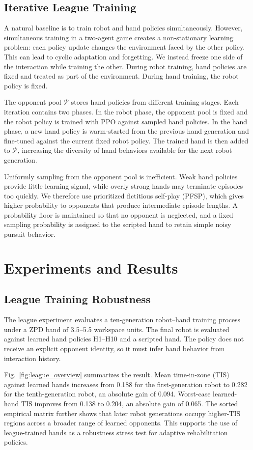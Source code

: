 \documentclass[lettersize,journal]{IEEEtran}
\begin{document}
\subsection{Iterative League Training}
A natural baseline is to train robot and hand policies simultaneously. However, simultaneous training in a two-agent game creates a non-stationary learning problem: each policy update changes the environment faced by the other policy. This can lead to cyclic adaptation and forgetting. We instead freeze one side of the interaction while training the other. During robot training, hand policies are fixed and treated as part of the environment. During hand training, the robot policy is fixed.

The opponent pool $\mathcal{P}$ stores hand policies from different training stages. Each iteration contains two phases. In the robot phase, the opponent pool is fixed and the robot policy is trained with PPO against sampled hand policies. In the hand phase, a new hand policy is warm-started from the previous hand generation and fine-tuned against the current fixed robot policy. The trained hand is then added to $\mathcal{P}$, increasing the diversity of hand behaviors available for the next robot generation.

Uniformly sampling from the opponent pool is inefficient. Weak hand policies provide little learning signal, while overly strong hands may terminate episodes too quickly. We therefore use prioritized fictitious self-play (PFSP), which gives higher probability to opponents that produce intermediate episode lengths. A probability floor is maintained so that no opponent is neglected, and a fixed sampling probability is assigned to the scripted hand to retain simple noisy pursuit behavior.

\section{Experiments and Results}
\subsection{League Training Robustness}
The league experiment evaluates a ten-generation robot--hand training process under a ZPD band of 3.5--5.5 workspace units. The final robot is evaluated against learned hand policies H1--H10 and a scripted hand. The policy does not receive an explicit opponent identity, so it must infer hand behavior from interaction history.

Fig.~\ref{fig:league_overview} summarizes the result. Mean time-in-zone (TIS) against learned hands increases from 0.188 for the first-generation robot to 0.282 for the tenth-generation robot, an absolute gain of 0.094. Worst-case learned-hand TIS improves from 0.138 to 0.204, an absolute gain of 0.065. The sorted empirical matrix further shows that later robot generations occupy higher-TIS regions across a broader range of learned opponents. This supports the use of league-trained hands as a robustness stress test for adaptive rehabilitation policies.
\end{document}
